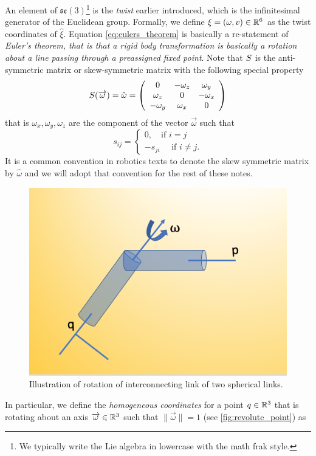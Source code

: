 %
An element of $\mathfrak{se(3)}$\footnote{We typically write the Lie algebra in lowercase with the math frak style.} is the \textit{twist} earlier introduced, which is the infinitesimal generator of the Euclidean group. Formally, we define $\xi = (\omega, v) \in \mathbb{R}^6$ as the twist coordinates of $\hat{\xi}$. Equation \eqref{eq:eulers_theorem} is basically a re-statement of \textit{Euler's theorem, that is that a rigid body transformation is basically a rotation about a line passing through a preassigned fixed point}. 
Note that $S$ is the anti-symmetric matrix or skew-symmetric matrix with the following special property
%
\begin{align}
\skew(\overrightarrow{\omega}) = \hat{\omega} = \left(\begin{array}{ccc}
0 & -\omega_z & \omega_y \\
%
\omega_z & 0 & -\omega_x \\
%
-\omega_y & \omega_x & 0
\end{array}\right)
\end{align}
%
that is $\omega_x, \omega_y, \omega_z$ are the component of the vector $\overrightarrow{\omega}$ such that 
\[
s_{ij} = \begin{cases}
0, \quad \text{if } i = j \\
-s_{ji} \quad \text{ if } i \neq j.
\end{cases}
\]
%
It is a common convention in robotics texts to denote the skew symmetric matrix by $\hat{\omega}$ and we will adopt that convention for the rest of these notes. 
%
\begin{figure}[tb!]
	\centering
	\includegraphics[width=.6\columnwidth]{figures/revolute.png}
	\caption{Illustration of rotation of interconnecting link of two spherical links.}
	\label{fig:revolute_point}
\end{figure}
%
In particular, we define the \textit{homogeneous coordinates} for a point $q \in \mathbb{R}^3$ that is rotating about an axis $\overrightarrow{\omega} \in \mathbb{R}^3$ such that $\|\overrightarrow{\omega}\| = 1$ (see \autoref{fig:revolute_point}) as 
